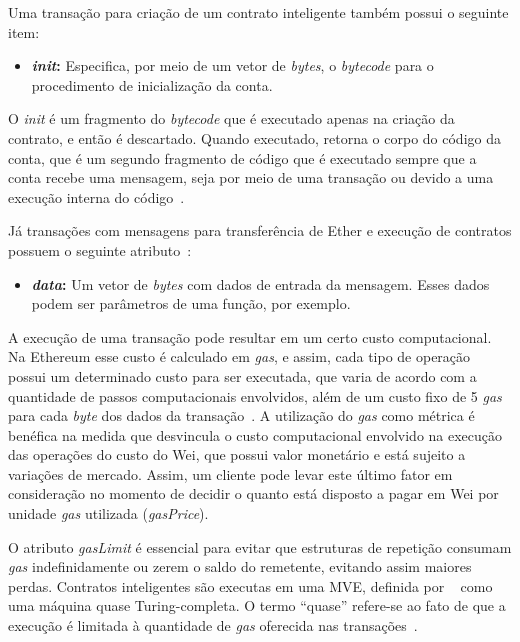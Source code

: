 Uma transação para criação de um contrato inteligente também possui o seguinte item:
\begin{itemize}
    \item \textbf{\textit{init}:} Especifica, por meio de um vetor de \textit{bytes}, o \textit{bytecode} para o procedimento de inicialização da conta. 
\end{itemize}

O \textit{init} é um fragmento do \textit{bytecode} que é executado apenas na criação da contrato, e então é descartado. Quando executado, retorna o corpo do código da conta, que é um segundo fragmento de código que é executado sempre que a conta recebe uma mensagem, seja por meio de uma transação ou devido a uma execução interna do código~\cite{wood2014ethereum-yellow-paper}. 

Já transações com mensagens para transferência de Ether e execução de contratos possuem o seguinte atributo~\cite{wood2014ethereum-yellow-paper}:
\begin{itemize}
    \item \textbf{\textit{data}:} Um vetor de \textit{bytes} com dados de entrada da mensagem. Esses dados podem ser parâmetros de uma função, por exemplo.
\end{itemize}

A execução de uma transação pode resultar em um certo custo computacional. Na Ethereum esse custo é calculado em \textit{gas}, e assim, cada tipo de operação possui um determinado custo para ser executada, que varia de acordo com a quantidade de passos computacionais envolvidos, além de um custo fixo de 5 \textit{gas} para cada \textit{byte} dos dados da transação~\cite{wood2014ethereum-yellow-paper}. A utilização do \textit{gas} como métrica é benéfica na medida que desvincula o custo computacional envolvido na execução das operações do custo do Wei, que possui valor monetário e está sujeito a variações de mercado. Assim, um cliente pode levar este último fator em consideração no momento de decidir o quanto está disposto a pagar em Wei por unidade \textit{gas} utilizada (\textit{gasPrice}).

O atributo \textit{gasLimit} é essencial para evitar que estruturas de repetição consumam \textit{gas} indefinidamente ou zerem o saldo do remetente, evitando assim maiores perdas. Contratos inteligentes são executas em uma MVE, definida por ~ como uma máquina quase Turing-completa. O termo ``quase'' refere-se ao fato de que a execução é limitada à quantidade de \textit{gas} oferecida nas transações~\cite{overview-chen2020blockchain-graph}.

